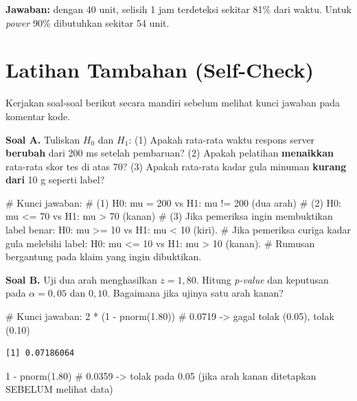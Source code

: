 \documentclass[
  indonesian,
  letterpaper,
]{book}
\newenvironment{Shaded}{\begin{snugshade}}{\end{snugshade}}
\newcommand{\CommentTok}[1]{\textcolor[rgb]{0.37,0.37,0.37}{#1}}
\newcommand{\DecValTok}[1]{\textcolor[rgb]{0.68,0.00,0.00}{#1}}
\newcommand{\FloatTok}[1]{\textcolor[rgb]{0.68,0.00,0.00}{#1}}
\newcommand{\FunctionTok}[1]{\textcolor[rgb]{0.28,0.35,0.67}{#1}}
\newcommand{\NormalTok}[1]{\textcolor[rgb]{0.00,0.23,0.31}{#1}}
\newcommand{\SpecialCharTok}[1]{\textcolor[rgb]{0.37,0.37,0.37}{#1}}
\begin{document}
\textbf{Jawaban:} dengan 40 unit, selisih 1 jam terdeteksi sekitar 81\%
dari waktu. Untuk \emph{power} 90\% dibutuhkan sekitar 54 unit.

\section{Latihan Tambahan
(Self-Check)}\label{latihan-tambahan-self-check-1}

Kerjakan soal-soal berikut secara mandiri sebelum melihat kunci jawaban
pada komentar kode.

\textbf{Soal A.} Tuliskan \(H_0\) dan \(H_1\): (1) Apakah rata-rata
waktu respons server \textbf{berubah} dari 200 ms setelah pembaruan? (2)
Apakah pelatihan \textbf{menaikkan} rata-rata skor tes di atas 70? (3)
Apakah rata-rata kadar gula minuman \textbf{kurang dari} 10 g seperti
label?

\begin{Shaded}
\begin{Highlighting}[]
\CommentTok{\# Kunci jawaban:}
\CommentTok{\# (1) H0: mu = 200 vs H1: mu != 200 (dua arah)}
\CommentTok{\# (2) H0: mu \textless{}= 70 vs H1: mu \textgreater{} 70 (kanan)}
\CommentTok{\# (3) Jika pemeriksa ingin membuktikan label benar: H0: mu \textgreater{}= 10 vs H1: mu \textless{} 10 (kiri).}
\CommentTok{\#     Jika pemeriksa curiga kadar gula melebihi label: H0: mu \textless{}= 10 vs H1: mu \textgreater{} 10 (kanan).}
\CommentTok{\#     Rumusan bergantung pada klaim yang ingin dibuktikan.}
\end{Highlighting}
\end{Shaded}

\textbf{Soal B.} Uji dua arah menghasilkan \(z = 1{,}80\). Hitung
\emph{p-value} dan keputusan pada \(\alpha = 0{,}05\) dan \(0{,}10\).
Bagaimana jika ujinya satu arah kanan?

\begin{Shaded}
\begin{Highlighting}[]
\CommentTok{\# Kunci jawaban:}
\DecValTok{2} \SpecialCharTok{*}\NormalTok{ (}\DecValTok{1} \SpecialCharTok{{-}} \FunctionTok{pnorm}\NormalTok{(}\FloatTok{1.80}\NormalTok{))   }\CommentTok{\# 0.0719 {-}\textgreater{} gagal tolak (0.05), tolak (0.10)}
\end{Highlighting}
\end{Shaded}

\begin{verbatim}
[1] 0.07186064
\end{verbatim}

\begin{Shaded}
\begin{Highlighting}[]
\DecValTok{1} \SpecialCharTok{{-}} \FunctionTok{pnorm}\NormalTok{(}\FloatTok{1.80}\NormalTok{)         }\CommentTok{\# 0.0359 {-}\textgreater{} tolak pada 0.05 (jika arah kanan ditetapkan SEBELUM melihat data)}
\end{Highlighting}
\end{Shaded}
\end{document}
